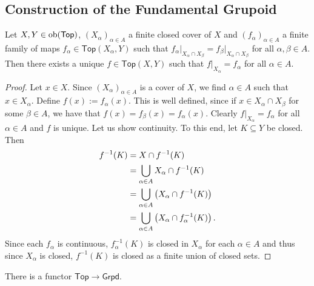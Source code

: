 \subsection*{Construction of the Fundamental Grupoid}

\begin{lemma}
	Let $X,Y \in \operatorname{ob}(\mathsf{Top})$, $(X_\alpha)_{\alpha \in A}$ a finite closed cover of $X$ and $(f_\alpha)_{\alpha \in A}$ a finite family of maps $f_\alpha \in \mathsf{Top}(X_\alpha,Y)$ such that $f_\alpha\vert_{X_\alpha \cap X_\beta} = f_\beta\vert_{X_\alpha \cap X_\beta}$ for all $\alpha,\beta \in A$. Then there exists a unique $f \in \mathsf{Top}(X,Y)$ such that $f\vert_{X_\alpha} = f_\alpha$ for all $\alpha \in A$.
	\label{lem:gluing_lemma}
\end{lemma}

\begin{proof}
	Let $x \in X$. Since $(X_\alpha)_{\alpha \in A}$ is a cover of $X$, we find $\alpha \in A$ such that $x \in X_\alpha$. Define $f(x) := f_\alpha(x)$. This is well defined, since if $x \in X_\alpha \cap X_\beta$ for some $\beta \in A$, we have that $f(x) = f_\beta(x) = f_\alpha(x)$. Clearly $f\vert_{X_\alpha} = f_\alpha$ for all $\alpha \in A$ and $f$ is unique. Let us show continuity. To this end, let $K \subseteq Y$ be closed. Then 
	\begin{align*}
		f^{-1}(K) &= X \cap f^{-1}(K)\\
		&= \bigcup_{\alpha \in A} X_\alpha \cap f^{-1}(K)\\
		&= \bigcup_{\alpha \in A} \del[1]{X_\alpha \cap f^{-1}(K)}\\
		&= \bigcup_{\alpha \in A} \del[1]{X_\alpha \cap f_\alpha^{-1}(K)}. 
	\end{align*}
	Since each $f_\alpha$ is continuous, $f_\alpha^{-1}(K)$ is closed in $X_\alpha$ for each $\alpha \in A$ and thus since $X_\alpha$ is closed, $f^{-1}(K)$ is closed as a finite union of closed sets.
\end{proof}

\begin{theorem}
	There is a functor $\mathsf{Top} \to \mathsf{Grpd}$.
	\label{thm:fundamental_groupoid}
\end{theorem}

